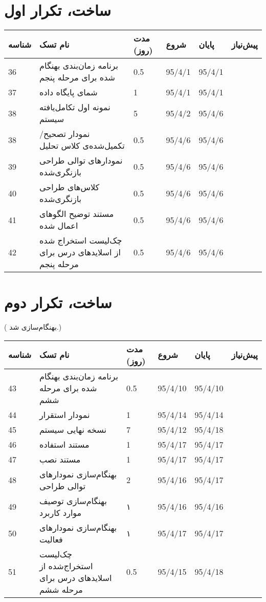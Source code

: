 \section{ساخت، تکرار اول}

\begin{tabular}[H]{ | l | l | l | l | l | l | }
	\hline
	شناسه & نام تسک & مدت (روز) & شروع & پایان & پیش‌نیاز    \\ \hline
	36 & برنامه زمان‌بندی بهنگام شده برای مرحله پنجم & 0.5   &   95/4/1 &   95/4/1 &  \\ \hline
	37 & شمای پایگاه داده & 1   &   95/4/1 &   95/4/1 &  \\ \hline
	38 & نمونه اول تکامل‌یافته سیستم & 5   &   95/4/2 &   95/4/6 &  \\ \hline
	38 & نمودار تصحیح/تکمیل‌شده‌ی کلاس تحلیل & 0.5 &   95/4/6 &   95/4/6 &  \\ \hline
	39 & نمودارهای توالی طراحی بازنگری‌شده & 0.5 &   95/4/6 &   95/4/6 &  \\ \hline
	40 & کلاس‌های طراحی بازنگری‌شده & 0.5   &   95/4/6 &   95/4/6 &  \\ \hline
	
	41 & مستند توضیح الگوهای اعمال شده & 0.5 &   95/4/6 &   95/4/6 &  \\ \hline
	
	42 & چک‌‌لیست استخراج شده از اسلایدهای درس برای مرحله پنجم & 0.5  &   95/4/6 &   95/4/6 &  \\ \hline
\end{tabular}

\section{ساخت، تکرار دوم}
({\color{red} بهنگام‌سازی شد.})

\begin{tabular}[H]{ | l | l | l | l | l | l | }
	\hline
	شناسه & نام تسک & مدت (روز) & شروع & پایان & پیش‌نیاز    \\ \hline
	43 & برنامه زمان‌بندی بهنگام شده برای مرحله ششم & 0.5   &   95/4/10 &   95/4/10 &  \\ \hline
	44 & نمودار استقرار & 1   &   95/4/14 &   95/4/14 &      \\ \hline
	45 & نسخه نهایی سیستم & 7   &   95/4/12 &   95/4/18 &      \\ \hline
	46 & مستند استفاده & 1   &   95/4/17 &   95/4/17 &  \\ \hline
	47 & مستند نصب & 1   &   95/4/17 &   95/4/17 &  \\ \hline
	48 & بهنگام‌سازی نمودارهای توالی طراحی & 2  &   95/4/16 &   95/4/17 &  \\ \hline
	49 & بهنگام‌سازی توصیف موارد کاربرد & ۱  &   95/4/16 &   95/4/16 &  \\ \hline			
	50 & بهنگام‌سازی نمودارهای فعالیت & ۱  &   95/4/17 &   95/4/17 &  \\ \hline
	51 & چک‌لیست استخراج‌شده از اسلایدهای درس برای مرحله ششم & 0.5   &   95/4/15 &   95/4/18 &  \\ \hline
\end{tabular}

